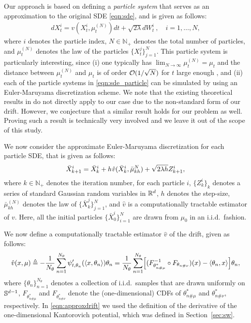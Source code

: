Our approach is based on defining a \emph{particle system} that serves as an approximation to the original SDE \eqref{eqn:sde}, and is given as follows:
\begin{align}
d X_t^i = v(X_t^i, \mu_t^{(N)}) dt + \sqrt{2 \lambda } d W_t^i \> , \quad i = 1,\dots, N, \label{eqn:sde_particle}
\end{align}
where $i$ denotes the particle index, $N \in \mathbb{N}_+$ denotes the total number of particles, and $\mu_t^{(N)}$ denotes the law of the particles $\{X_t^j\}_{j=1}^N$. This particle system is particularly interesting, since (i) one typically has $\lim_{N \rightarrow \infty} \mu_t^{(N)}= \mu_t $ and the distance between $\mu_t^{(N)}$ and $\mu_t$ is of order ${\cal O}(1/\sqrt{N})$ for $t$ large enough \cite{malrieu03,cgm-08}, and (ii) each of the particle systems in \eqref{eqn:sde_particle} can be simulated by using an Euler-Maruyama discretization scheme. We note that the existing theoretical results in \cite{veretennikov2006ergodic,mishura2016existence} do not directly apply to our case due to the non-standard form of our drift. However, we conjecture that a similar result holds for our problem as well. Proving such a result is technically very involved and we leave it out of the scope of this study. %




We now consider the approximate Euler-Maruyama discretization for each particle SDE, that is given as follows:
\begin{align}
\bar{X}^i_{k+1} = \bar{X}^i_k + h \hspace{0.5pt} \hat{v}(\bar{X}^i_k, \bar{\mu}_{kh}^N ) + \sqrt{2 \lambda h} Z^i_{k+1},
\end{align}
where $k \in \mathbb{N}_+$ denotes the iteration number, for each particle $i$, $\{Z^i_k\}_{k}$ denotes a series of standard Gaussian random variables in $\mathbb{R}^d$, $h$ denotes the step-size, $\bar{\mu}_{kh}^{(N)}$ denotes the law of $\{\bar{X}_{k}^j\}_{j=1}^N$, and $\hat{v}$ is a computationally tractable estimator of $v$. Here, all the initial particles $\{\bar{X}_0^i\}_{i=1}^N$ are drawn from $\mu_0$ in an i.i.d.\ fashion.

We now define a computationally tractable estimator $\hat{v}$ of the drift, given as follows:
\begin{align}
\hat{v}(x,\mu) \triangleq - \frac1{N_\theta} \sum_{n=1}^{N_\theta} \psi_{t, \theta_n}'(\langle x , \theta_n \rangle ) \theta_n = \frac1{N_\theta} \sum_{n=1}^{N_\theta} \Bigl[ (F_{\theta_{n\#\mu}^*}^{-1} \circ F_{\theta_{n\#\nu}}) (x) - \langle \theta_n, x\rangle \Bigr] \theta_n , \label{eqn:approxdrift}
\end{align}
where $\{\theta_n\}_{n=1}^{N_\theta}$ denotes a collection of i.i.d.\ samples that are drawn uniformly on $\mathbb{S}^{d-1}$, $F_{\theta_{n\#\mu}^*}$ and $F_{\theta_{n\#\nu}^*}$ denote the (one-dimensional) CDFs of $\theta_{n\#\mu}^*$ and $\theta_{n\#\nu}^*$, respectively. In \eqref{eqn:approxdrift} we used the definition of the derivative of the one-dimensional Kantorovich potential, which was defined in Section~\ref{sec:sw}. 


